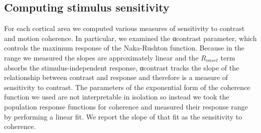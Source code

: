 \documentclass{report}
\begin{document}
\subsection{Computing stimulus sensitivity}
For each cortical area we computed various measures of sensitivity to contrast and motion coherence. In particular, we examined the αcontrast parameter, which controls the maximum response of the Naka-Rushton function. Because in the range we measured the slopes are approximately linear and the $R_{onset}$ term absorbs the stimulus-independent response, αcontrast tracks the slope of the relationship between contrast and response and therefore is a measure of sensitivity to contrast. The parameters of the exponential form of the coherence function we used are not interpretable in isolation so instead we took the population response functions for coherence and measured their response range by performing a linear fit. We report the slope of that fit as the sensitivity to coherence.
\end{document}
